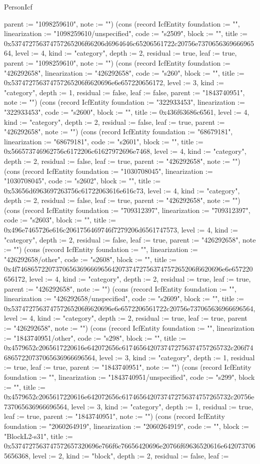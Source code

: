 \begin{lexlean}{PersonIcf}
\begin{semanticmodule}
{parent := "1098259610", note := ""}) (cons (record IcfEntity {foundation := "", linearization := "1098259610/unspecified", code := "s2509", block := "", title := 0x537472756374757265206f66206d6964646c65206561722c20756e737065636966696564, level := 4, kind := "category", depth := 2, residual := true, leaf := true, parent := "1098259610", note := ""}) (cons (record IcfEntity {foundation := "426292658", linearization := "426292658", code := "s260", block := "", title := 0x537472756374757265206f6620696e6e657220656172, level := 3, kind := "category", depth := 1, residual := false, leaf := false, parent := "1843740951", note := ""}) (cons (record IcfEntity {foundation := "322933453", linearization := "322933453", code := "s2600", block := "", title := 0x436f63686c6561, level := 4, kind := "category", depth := 2, residual := false, leaf := true, parent := "426292658", note := ""}) (cons (record IcfEntity {foundation := "68679181", linearization := "68679181", code := "s2601", block := "", title := 0x566573746962756c6172206c61627972696e7468, level := 4, kind := "category", depth := 2, residual := false, leaf := true, parent := "426292658", note := ""}) (cons (record IcfEntity {foundation := "1030708045", linearization := "1030708045", code := "s2602", block := "", title := 0x53656d6963697263756c61722063616e616c73, level := 4, kind := "category", depth := 2, residual := false, leaf := true, parent := "426292658", note := ""}) (cons (record IcfEntity {foundation := "709312397", linearization := "709312397", code := "s2603", block := "", title := 0x496e7465726e616c2061756469746f7279206d6561747573, level := 4, kind := "category", depth := 2, residual := false, leaf := true, parent := "426292658", note := ""}) (cons (record IcfEntity {foundation := "", linearization := "426292658/other", code := "s2608", block := "", title := 0x4f746865722073706563696669656420737472756374757265206f6620696e6e657220656172, level := 4, kind := "category", depth := 2, residual := true, leaf := true, parent := "426292658", note := ""}) (cons (record IcfEntity {foundation := "", linearization := "426292658/unspecified", code := "s2609", block := "", title := 0x537472756374757265206f6620696e6e6572206561722c20756e737065636966696564, level := 4, kind := "category", depth := 2, residual := true, leaf := true, parent := "426292658", note := ""}) (cons (record IcfEntity {foundation := "", linearization := "1843740951/other", code := "s298", block := "", title := 0x4579652c2065617220616e642072656c6174656420737472756374757265732c206f7468657220737065636966696564, level := 3, kind := "category", depth := 1, residual := true, leaf := true, parent := "1843740951", note := ""}) (cons (record IcfEntity {foundation := "", linearization := "1843740951/unspecified", code := "s299", block := "", title := 0x4579652c2065617220616e642072656c6174656420737472756374757265732c20756e737065636966696564, level := 3, kind := "category", depth := 1, residual := true, leaf := true, parent := "1843740951", note := ""}) (cons (record IcfEntity {foundation := "2060264919", linearization := "2060264919", code := "", block := "BlockL2-s31", title := 0x5374727563747572657320696e766f6c76656420696e20766f69636520616e6420737065656368, level := 2, kind := "block", depth := 2, residual := false, leaf := }
\end{semanticmodule}
\end{lexlean}
